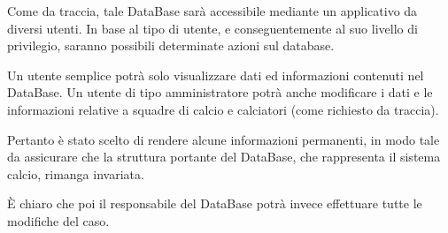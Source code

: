 \bigskip
\bigskip

Come da traccia, tale DataBase sarà accessibile mediante un applicativo da diversi utenti.
In base al tipo di utente, e conseguentemente al suo livello di privilegio, saranno possibili
determinate azioni sul database.

Un utente semplice potrà solo visualizzare dati ed informazioni contenuti nel DataBase.
Un utente di tipo amministratore potrà anche modificare i dati e le informazioni relative a
squadre di calcio e calciatori (come richiesto da traccia).

Pertanto è stato scelto di rendere alcune informazioni permanenti, in modo tale da assicurare
che la struttura portante del DataBase, che rappresenta il sistema calcio, rimanga invariata.

È chiaro che poi il responsabile del DataBase potrà invece effettuare tutte le modifiche del caso.